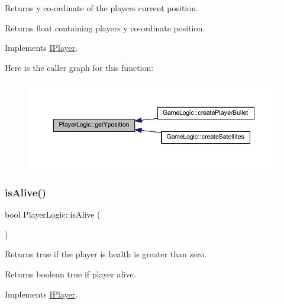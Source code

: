 Returns y co-\/ordinate of the player\textquotesingle{}s current position. 

\begin{DoxyReturn}{Returns}
float containing players y co-\/ordinate position. 
\end{DoxyReturn}


Implements \hyperlink{class_i_player_af72407abf2418dd9c1df50f29d51f0ef}{I\+Player}.

Here is the caller graph for this function\+:
\nopagebreak
\begin{figure}[H]
\begin{center}
\leavevmode
\includegraphics[width=350pt]{class_player_logic_a58d683bde5ee078f3b21897f2a5f4677_icgraph}
\end{center}
\end{figure}
\mbox{\label{class_player_logic_a765133271ba47a6fa9b2b45136f1fe73}} 
\subsubsection{\texorpdfstring{is\+Alive()}{isAlive()}}
{\footnotesize\ttfamily bool Player\+Logic\+::is\+Alive (\begin{DoxyParamCaption}{ }\end{DoxyParamCaption})\hspace{0.3cm}{\ttfamily [virtual]}}



Returns true if the player is health is greater than zero. 

\begin{DoxyReturn}{Returns}
boolean true if player alive. 
\end{DoxyReturn}


Implements \hyperlink{class_i_player_a5b417cd92b4463e1c296a627430282b6}{I\+Player}.

\mbox{\label{class_player_logic_ac4d252e80757e05b5799ab689ee27d5e}} 
